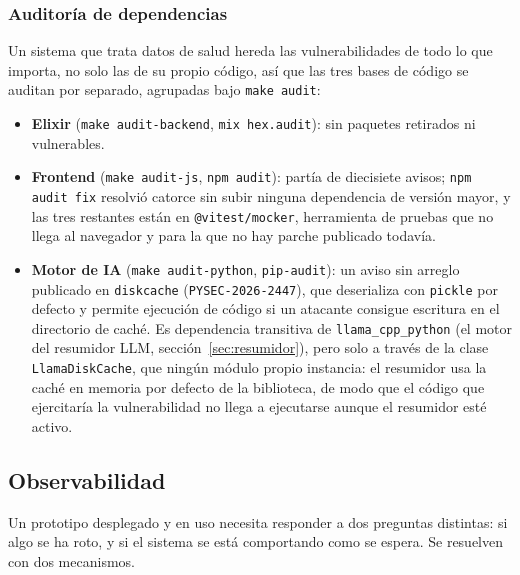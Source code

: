 \subsubsection{Auditoría de dependencias}

Un sistema que trata datos de salud hereda las vulnerabilidades de todo lo que importa, no solo las de su propio código, así que las tres bases de código se auditan por separado, agrupadas bajo \texttt{make audit}:

\begin{itemize}
 \item \textbf{Elixir} (\texttt{make audit-backend}, \texttt{mix hex.audit}): sin paquetes retirados ni vulnerables.
 \item \textbf{Frontend} (\texttt{make audit-js}, \texttt{npm audit}): partía de diecisiete avisos; \texttt{npm audit fix} resolvió catorce sin subir ninguna dependencia de versión mayor, y las tres restantes están en \texttt{@vitest/mocker}, herramienta de pruebas que no llega al navegador y para la que no hay parche publicado todavía.
 \item \textbf{Motor de IA} (\texttt{make audit-python}, \texttt{pip-audit}): un aviso sin arreglo publicado en \texttt{diskcache} (\texttt{PYSEC-2026-2447\allowbreak}), que deserializa con \texttt{pickle} por defecto y permite ejecución de código si un atacante consigue escritura en el directorio de caché. Es dependencia transitiva de \texttt{llama\_cpp\_python} (el motor del resumidor LLM, sección~\ref{sec:resumidor}), pero solo a través de la clase \texttt{LlamaDiskCache}, que ningún módulo propio instancia: el resumidor usa la caché en memoria por defecto de la biblioteca, de modo que el código que ejercitaría la vulnerabilidad no llega a ejecutarse aunque el resumidor esté activo.
\end{itemize}

\subsection{Observabilidad}
\label{sec:observabilidad}

Un prototipo desplegado y en uso necesita responder a dos preguntas distintas: si algo se ha roto, y si el sistema se está comportando como se espera. Se resuelven con dos mecanismos.


